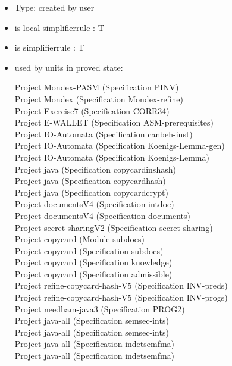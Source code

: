\documentclass[a4paper]{article}
\begin{document}
\begin{itemize}

\item Type: created by user

\item is local simplifierrule : T
\item is simplifierrule : T
\item used by units in proved state:

Project Mondex-PASM (Specification PINV) \\
Project Mondex (Specification Mondex-refine) \\
Project Exercise7 (Specification CORR34) \\
Project E-WALLET (Specification ASM-prerequisites) \\
Project IO-Automata (Specification canbeh-inst) \\
Project IO-Automata (Specification Koenigs-Lemma-gen) \\
Project IO-Automata (Specification Koenigs-Lemma) \\
Project java (Specification copycardinshash) \\
Project java (Specification copycardhash) \\
Project java (Specification copycardcrypt) \\
Project documentsV4 (Specification intdoc) \\
Project documentsV4 (Specification documents) \\
Project secret-sharingV2 (Specification secret-sharing) \\
Project copycard (Module subdocs) \\
Project copycard (Specification subdocs) \\
Project copycard (Specification knowledge) \\
Project copycard (Specification admissible) \\
Project refine-copycard-hash-V5 (Specification INV-preds) \\
Project refine-copycard-hash-V5 (Specification INV-progs) \\
Project needham-java3 (Specification PROG2) \\
Project java-all (Specification semsec-ints) \\
Project java-all (Specification semsec-ints) \\
Project java-all (Specification indetsemfma) \\
Project java-all (Specification indetsemfma) \\

\end{itemize}
\end{document}
